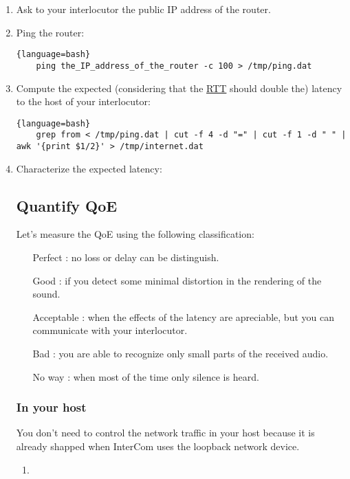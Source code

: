 \begin{enumerate}
\item Ask to your interlocutor the public IP address of the router.
\item Ping the router:
  \begin{lstlisting}{language=bash}
    ping the_IP_address_of_the_router -c 100 > /tmp/ping.dat
  \end{lstlisting}
\item Compute the expected (considering that the
  \href{https://en.wikipedia.org/wiki/Round-trip_delay}{RTT} should
  double the) latency to the host of your interlocutor:
  \begin{lstlisting}{language=bash}
    grep from < /tmp/ping.dat | cut -f 4 -d "=" | cut -f 1 -d " " | awk '{print $1/2}' > /tmp/internet.dat
  \end{lstlisting}
\item Characterize the expected latency:

\subsection{Quantify QoE}

Let's measure the QoE using the following classification:
\begin{itemize}
\item [Perfect]: no loss or delay can be distinguish.
\item [Good]: if you detect some minimal distortion in the rendering
  of the sound.
\item [Acceptable]: when the effects of the latency are apreciable, but
  you can communicate with your interlocutor.
\item [Bad]: you are able to recognize only small parts of the
  received audio.
\item [No way]: when most of the time only silence is heard.
\end{itemize}

\subsubsection{In your host}

You don't need to control the network traffic in your host because it
is already shapped when InterCom uses the loopback network device.

\begin{enumerate}
  
\item 


\end{enumerate}
\end{enumerate}
